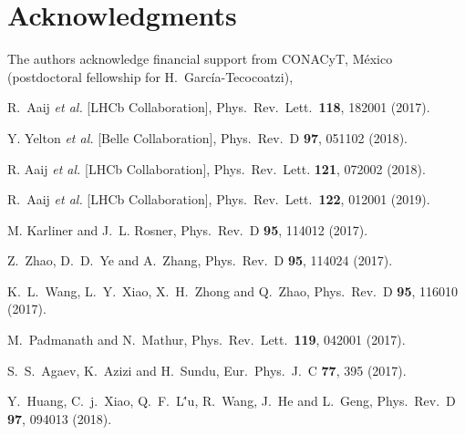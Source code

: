 \documentclass[twocolumn,superscriptaddress,preprintnumbers,nofootinbib]{revtex4}
\begin{document}
\section*{Acknowledgments}
The authors acknowledge financial support from CONACyT, M\'exico (postdoctoral fellowship for H.~Garc\'ia-Tecocoatzi), 
\clearpage
\begin{thebibliography}{90}

  R.~Aaij {\it et al.} [LHCb Collaboration],
  Phys.\ Rev.\ Lett.\  {\bf 118}, 182001 (2017).

  Y. Yelton {\it et al.} [Belle Collaboration],
  Phys.\ Rev.\ D {\bf 97}, 051102 (2018).
  
  R. Aaij {\it et al.} [LHCb Collaboration],
  Phys.\ Rev.\ Lett.  {\bf 121}, 072002 (2018). 
  
  R.~Aaij {\it et al.} [LHCb Collaboration],
  Phys.\ Rev.\ Lett.\  {\bf 122}, 012001 (2019).

  M. Karliner and J.~L. Rosner, 
  Phys.\ Rev.\ D {\bf 95}, 114012 (2017).

  Z.~Zhao, D.~D.~Ye and A.~Zhang,
  Phys.\ Rev.\ D {\bf 95}, 114024 (2017).

  K.~L.~Wang, L.~Y.~Xiao, X.~H.~Zhong and Q.~Zhao,
  Phys.\ Rev.\ D {\bf 95}, 116010 (2017).

  M.~Padmanath and N.~Mathur,
  Phys.\ Rev.\ Lett.\  {\bf 119}, 042001 (2017).

  S.~S.~Agaev, K.~Azizi and H.~Sundu,
  Eur.\ Phys.\ J.\ C {\bf 77}, 395 (2017).
  
  Y.~Huang, C.~j.~Xiao, Q.~F.~L\''u, R.~Wang, J.~He and L.~Geng,
  Phys.\ Rev.\ D {\bf 97}, 094013 (2018).


\end{thebibliography}
\end{document}
